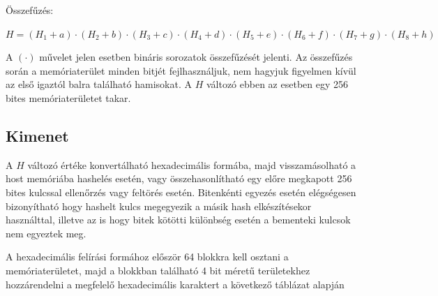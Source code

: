 Összefűzés:

{\hfil $ H = (H_1 + a) \cdot (H_2 + b) \cdot (H_3 + c) \cdot (H_4 + d) \cdot (H_5 + e) \cdot (H_6 + f) \cdot (H_7 + g) \cdot (H_8 + h)  $ \par}

\bigbreak

A $(\cdot)$ művelet jelen esetben bináris sorozatok összefűzését jelenti. Az összefűzés során a memóriaterület minden bitjét fejlhasználjuk, nem hagyjuk figyelmen kívül az első igaztól balra található hamisokat. A $H$ változó ebben az esetben egy 256 bites memóriaterületet takar.



\subsection{Kimenet}


A $H$ változó értéke konvertálható hexadecimális formába, majd visszamásolható a host memóriába hashelés esetén, vagy összehasonlítható egy előre megkapott 256 bites kulcssal ellenőrzés vagy feltörés esetén. Bitenkénti egyezés esetén elégségesen bizonyítható hogy hashelt kulcs megegyezik a másik hash elkészítésekor használttal, illetve az is hogy bitek kötötti különbség esetén a bementeki kulcsok nem egyeztek meg.

A hexadecimális felírási formához először 64 blokkra kell osztani a memóriaterületet, majd a blokkban található 4 bit méretű területekhez hozzárendelni a megfelelő hexadecimális karaktert a következő táblázat alapján


